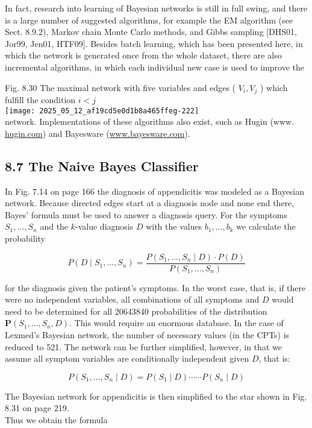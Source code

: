 \documentclass[10pt]{article}
\begin{document}
In fact, research into learning of Bayesian networks is still in full swing, and there is a large number of suggested algorithms, for example the EM algorithm (see Sect. 8.9.2), Markov chain Monte Carlo methods, and Gibbs sampling [DHS01, Jor99, Jen01, HTF09]. Besides batch learning, which has been presented here, in which the network is generated once from the whole dataset, there are also incremental algorithms, in which each individual new case is used to improve the

Fig. 8.30 The maximal network with five variables and edges ( $V_{i}, V_{j}$ ) which fulfill the condition $i<j$\\
\texttt{[image: 2025\_05\_12\_af19cd5e0d1b8a465ffeg-222]}\\
network. Implementations of these algorithms also exist, such as Hugin (www. \href{http://hugin.com}{hugin.com}) and Bayesware (\href{http://www.bayesware.com}{www.bayesware.com}).

\subsection*{8.7 The Naive Bayes Classifier}
In Fig. 7.14 on page 166 the diagnosis of appendicitis was modeled as a Bayesian network. Because directed edges start at a diagnosis node and none end there, Bayes’ formula must be used to answer a diagnosis query. For the symptoms $S_{1}, \ldots, S_{n}$ and the $k$-value diagnosis $D$ with the values $b_{1}, \ldots, b_{k}$ we calculate the probability

$$
P\left(D \mid S_{1}, \ldots, S_{n}\right)=\frac{P\left(S_{1}, \ldots, S_{n} \mid D\right) \cdot P(D)}{P\left(S_{1}, \ldots, S_{n}\right)}
$$

for the diagnosis given the patient's symptoms. In the worst case, that is, if there were no independent variables, all combinations of all symptoms and $D$ would need to be determined for all 20643840 probabilities of the distribution $\boldsymbol{P}\left(S_{1}, \ldots, S_{n}, D\right)$. This would require an enormous database. In the case of Lexmed's Bayesian network, the number of necessary values (in the CPTs) is reduced to 521. The network can be further simplified, however, in that we assume all symptom variables are conditionally independent given $D$, that is:

$$
P\left(S_{1}, \ldots, S_{n} \mid D\right)=P\left(S_{1} \mid D\right) \cdots \cdots P\left(S_{n} \mid D\right)
$$

The Bayesian network for appendicitis is then simplified to the star shown in Fig. 8.31 on page 219.\\
Thus we obtain the formula
\end{document}
